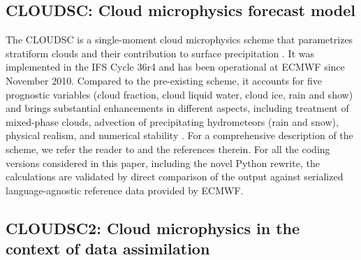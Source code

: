 \documentclass[../main.tex]{subfiles}
\begin{document}

    \subsection{CLOUDSC: Cloud microphysics forecast model}

        The CLOUDSC is a single-moment cloud microphysics scheme that parametrizes stratiform clouds and their contribution to surface precipitation \citep{ifs48r1}. It was implemented in the IFS Cycle 36r4 and has been operational at ECMWF since November 2010. Compared to the pre-existing scheme, it accounts for five prognostic variables (cloud fraction, cloud liquid water, cloud ice, rain and show) and brings substantial enhancements in different aspects, including treatment of mixed-phase clouds, advection of precipitating hydrometeors (rain and snow), physical realism, and numerical stability \citep{nogherotto16}. For a comprehensive description of the scheme, we refer the reader to \citet{forbes11b} and the references therein. For all the coding versions considered in this paper, including the novel Python rewrite, the calculations are validated by direct comparison of the output against serialized language-agnostic reference data provided by ECMWF.

    \subsection{CLOUDSC2: Cloud microphysics in the context of data assimilation}
\end{document}
